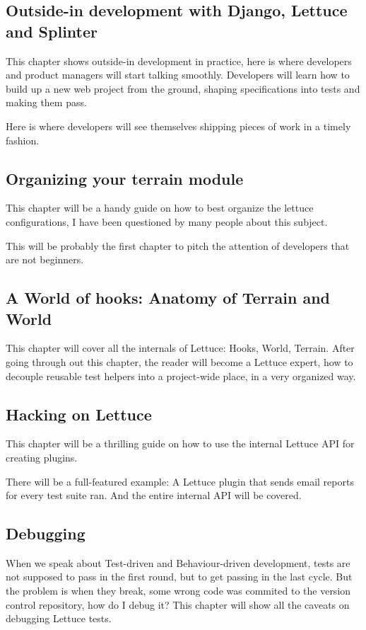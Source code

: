 \documentclass[letterpaper]{article}
\begin{document}
\subsection*{Outside-in development with Django, Lettuce and Splinter}
This chapter shows outside-in development in practice, here is where
developers and product managers will start talking smoothly.
Developers will learn how to build up a new web project from the
ground, shaping specifications into tests and making them pass.

Here is where developers will see themselves shipping pieces of work in a timely fashion.

\subsection*{Organizing your terrain module}
This chapter will be a handy guide on how to best organize the lettuce
configurations, I have been questioned by many people about this subject.

\noindent
This will be probably the first chapter to pitch the attention of
developers that are not beginners.

\subsection*{A World of hooks: Anatomy of Terrain and World}
This chapter will cover all the internals of Lettuce: Hooks, World,
Terrain.  After going through out this chapter, the reader will become
a Lettuce expert, how to decouple reusable test helpers into a
project-wide place, in a very organized way.

\subsection*{Hacking on Lettuce}
This chapter will be a thrilling guide on how to use the internal
Lettuce API for creating plugins.

There will be a full-featured example: A Lettuce plugin that sends
email reports for every test suite ran.
And the entire internal API will be covered.

\subsection*{Debugging}
When we speak about Test-driven and Behaviour-driven development,
tests are not supposed to pass in the first round, but to get passing
in the last cycle.
But the problem is when they break, some wrong code was commited to
the version control repository, how do I debug it?
This chapter will show all the caveats on debugging Lettuce tests.
\end{document}
